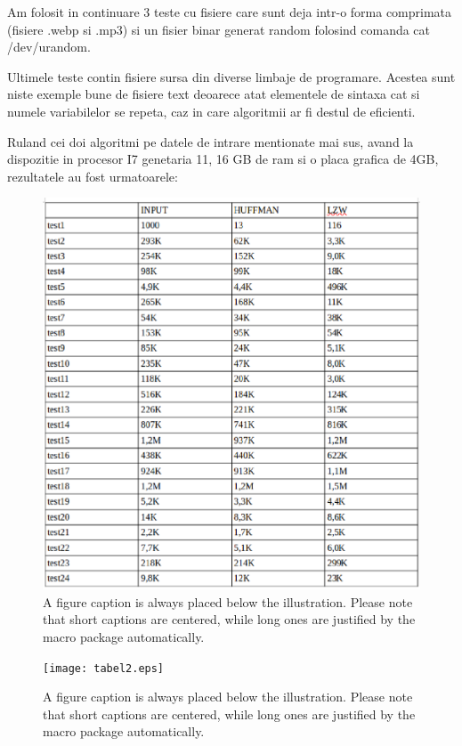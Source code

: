 \documentclass[runningheads]{llncs}
\begin{document}
Am folosit in continuare 3 teste cu fisiere care sunt deja intr-o forma comprimata (fisiere .webp si .mp3) si un fisier binar generat random folosind comanda cat /dev/urandom.

Ultimele teste contin fisiere sursa din diverse limbaje de programare. Acestea sunt niste exemple bune de fisiere text deoarece atat elementele de sintaxa cat si
numele variabilelor se repeta, caz in care algoritmii ar fi destul de eficienti.

Ruland cei doi algoritmi pe datele de intrare mentionate mai sus, avand la dispozitie in procesor I7 genetaria 11, 16 GB de ram si o placa grafica de 4GB, rezultatele au fost urmatoarele:

\begin{figure}
\includegraphics[width=\textwidth]{tabel1.eps}
\caption{A figure caption is always placed below the illustration.
Please note that short captions are centered, while long ones are
justified by the macro package automatically.} \label{fig1}
\end{figure}

\begin{figure}
\texttt{[image: tabel2.eps]}
\caption{A figure caption is always placed below the illustration.
Please note that short captions are centered, while long ones are
justified by the macro package automatically.} \label{fig2}
\end{figure}
\end{document}
